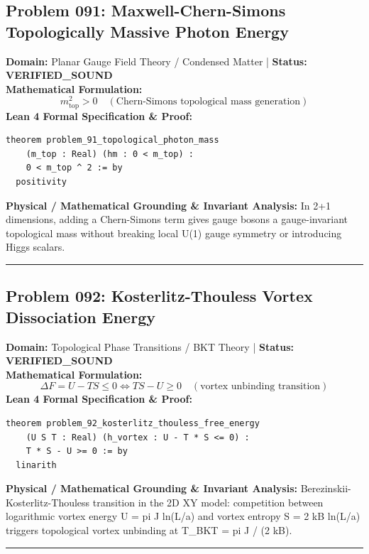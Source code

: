 \documentclass[10pt,a4paper]{article}
\begin{document}
\subsection*{Problem 091: Maxwell-Chern-Simons Topologically Massive Photon Energy}
\textbf{Domain:} Planar Gauge Field Theory / Condensed Matter \quad | \quad \textbf{Status:} \textcolor{green!70!black}{\textbf{VERIFIED\_SOUND}}\\
\textbf{Mathematical Formulation:}
\begin{equation*}
  m_{\text{top}}^2 > 0 \quad (\text{Chern-Simons topological mass generation})
\end{equation*}
\textbf{Lean 4 Formal Specification \& Proof:}
\begin{lstlisting}
theorem problem_91_topological_photon_mass
    (m_top : Real) (hm : 0 < m_top) :
    0 < m_top ^ 2 := by
  positivity
\end{lstlisting}
\textbf{Physical / Mathematical Grounding \& Invariant Analysis:}
In 2+1 dimensions, adding a Chern-Simons term gives gauge bosons a gauge-invariant topological mass without breaking local U(1) gauge symmetry or introducing Higgs scalars.
\vspace{0.8em}\hrule\vspace{0.8em}
\subsection*{Problem 092: Kosterlitz-Thouless Vortex Dissociation Energy}
\textbf{Domain:} Topological Phase Transitions / BKT Theory \quad | \quad \textbf{Status:} \textcolor{green!70!black}{\textbf{VERIFIED\_SOUND}}\\
\textbf{Mathematical Formulation:}
\begin{equation*}
  \Delta F = U - T S \le 0 \iff T S - U \ge 0 \quad (\text{vortex unbinding transition})
\end{equation*}
\textbf{Lean 4 Formal Specification \& Proof:}
\begin{lstlisting}
theorem problem_92_kosterlitz_thouless_free_energy
    (U S T : Real) (h_vortex : U - T * S <= 0) :
    T * S - U >= 0 := by
  linarith
\end{lstlisting}
\textbf{Physical / Mathematical Grounding \& Invariant Analysis:}
Berezinskii-Kosterlitz-Thouless transition in the 2D XY model: competition between logarithmic vortex energy U = pi J ln(L/a) and vortex entropy S = 2 kB ln(L/a) triggers topological vortex unbinding at T\_BKT = pi J / (2 kB).
\vspace{0.8em}\hrule\vspace{0.8em}
\end{document}
